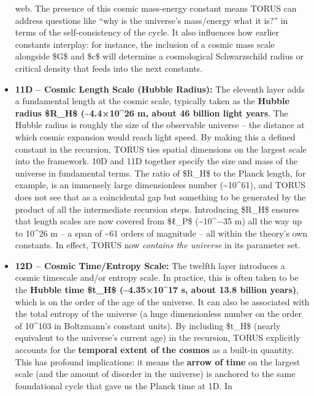 \documentclass[
]{article}
\begin{document}
\begin{itemize}
  web. The presence of this cosmic mass-energy constant means TORUS can
  address questions like ``why is the universe's mass/energy what it
  is?'' in terms of the self-consistency of the cycle. It also
  influences how earlier constants interplay: for instance, the
  inclusion of a cosmic mass scale alongside \$G\$ and \$c\$ will
  determine a cosmological Schwarzschild radius or critical density that
  feeds into the next constants.
\item
  \textbf{11D -- Cosmic Length Scale (Hubble Radius):} The eleventh
  layer adds a fundamental length at the cosmic scale, typically taken
  as the \textbf{Hubble radius \$R\_H\$ (\textasciitilde4.4×10\^{}26 m,
  about 46 billion light years}. The Hubble radius is roughly the size
  of the observable universe -- the distance at which cosmic expansion
  would reach light speed. By making this a defined constant in the
  recursion, TORUS ties spatial dimensions on the largest scale into the
  framework. 10D and 11D together specify the size and mass of the
  universe in fundamental terms. The ratio of \$R\_H\$ to the Planck
  length, for example, is an immensely large dimensionless number
  (\textasciitilde10\^{}61), and TORUS does not see that as a
  coincidental gap but something to be generated by the product of all
  the intermediate recursion steps. Introducing \$R\_H\$ ensures that
  length scales are now covered from \$ℓ\_P\$ (\textasciitilde10\^{}−35
  m) all the way up to 10\^{}26 m -- a span of \textasciitilde61 orders
  of magnitude -- all within the theory's own constants. In effect,
  TORUS now \emph{contains the universe} in its parameter set.
\item
  \textbf{12D -- Cosmic Time/Entropy Scale:} The twelfth layer
  introduces a cosmic timescale and/or entropy scale. In practice, this
  is often taken to be the \textbf{Hubble time \$t\_H\$
  (\textasciitilde4.35×10\^{}17 s, about 13.8 billion years)}, which is
  on the order of the age of the universe\hspace{0pt}. It can also be
  associated with the total entropy of the universe (a huge
  dimensionless number on the order of 10\^{}103 in Boltzmann's constant
  units). By including \$t\_H\$ (nearly equivalent to the universe's
  current age) in the recursion, TORUS explicitly accounts for the
  \textbf{temporal extent of the cosmos} as a built-in quantity. This
  has profound implications: it means the \textbf{arrow of time} on the
  largest scale (and the amount of disorder in the universe) is anchored
  to the same foundational cycle that gave us the Planck time at 1D. In

\end{itemize}
\end{document}
